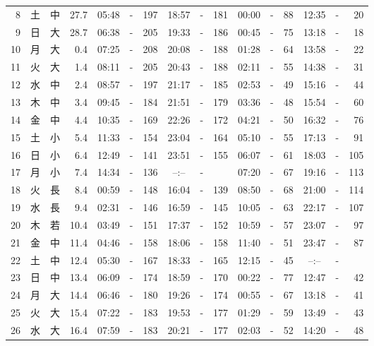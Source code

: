 \documentclass[12pt.a4j]{jsarticle}
\begin{document}
\begin{center}
\begin{table}[ht]
\begin{tabular}{|rc|cr|ccrccr|ccrccr|}
 8 & 土 & 中 & 27.7 &  05:48 &-& 197  &  18:57 &-& 181  &   00:00 &-&  88  &   12:35 &-&  20  \\
 9 & 日 & 大 & 28.7 &  06:38 &-& 205  &  19:33 &-& 186  &   00:45 &-&  75  &   13:18 &-&  18  \\
10 & 月 & 大 &  0.4 &  07:25 &-& 208  &  20:08 &-& 188  &   01:28 &-&  64  &   13:58 &-&  22  \\
11 & 火 & 大 &  1.4 &  08:11 &-& 205  &  20:43 &-& 188  &   02:11 &-&  55  &   14:38 &-&  31  \\
12 & 水 & 中 &  2.4 &  08:57 &-& 197  &  21:17 &-& 185  &   02:53 &-&  49  &   15:16 &-&  44  \\
13 & 木 & 中 &  3.4 &  09:45 &-& 184  &  21:51 &-& 179  &   03:36 &-&  48  &   15:54 &-&  60  \\
14 & 金 & 中 &  4.4 &  10:35 &-& 169  &  22:26 &-& 172  &   04:21 &-&  50  &   16:32 &-&  76  \\
15 & 土 & 小 &  5.4 &  11:33 &-& 154  &  23:04 &-& 164  &   05:10 &-&  55  &   17:13 &-&  91  \\
16 & 日 & 小 &  6.4 &  12:49 &-& 141  &  23:51 &-& 155  &   06:07 &-&  61  &   18:03 &-& 105  \\
17 & 月 & 小 &  7.4 &  14:34 &-& 136  &  --:-- &-&     &   07:20 &-&  67  &   19:16 &-& 113  \\
18 & 火 & 長 &  8.4 &  00:59 &-& 148  &  16:04 &-& 139  &   08:50 &-&  68  &   21:00 &-& 114  \\
19 & 水 & 長 &  9.4 &  02:31 &-& 146  &  16:59 &-& 145  &   10:05 &-&  63  &   22:17 &-& 107  \\
20 & 木 & 若 & 10.4 &  03:49 &-& 151  &  17:37 &-& 152  &   10:59 &-&  57  &   23:07 &-&  97  \\
21 & 金 & 中 & 11.4 &  04:46 &-& 158  &  18:06 &-& 158  &   11:40 &-&  51  &   23:47 &-&  87  \\
22 & 土 & 中 & 12.4 &  05:30 &-& 167  &  18:33 &-& 165  &   12:15 &-&  45  &   --:-- &-&     \\
23 & 日 & 中 & 13.4 &  06:09 &-& 174  &  18:59 &-& 170  &   00:22 &-&  77  &   12:47 &-&  42  \\
24 & 月 & 大 & 14.4 &  06:46 &-& 180  &  19:26 &-& 174  &   00:55 &-&  67  &   13:18 &-&  41  \\
25 & 火 & 大 & 15.4 &  07:22 &-& 183  &  19:53 &-& 177  &   01:29 &-&  59  &   13:49 &-&  43  \\
26 & 水 & 大 & 16.4 &  07:59 &-& 183  &  20:21 &-& 177  &   02:03 &-&  52  &   14:20 &-&  48  \\

\end{tabular}
\end{table}
\end{center}
\end{document}
